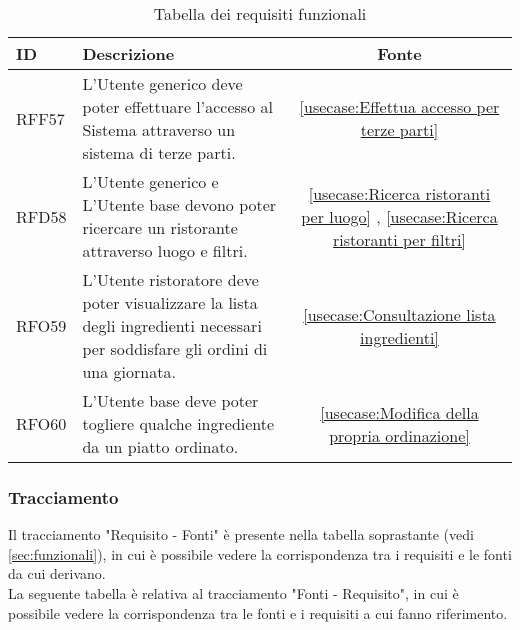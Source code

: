 \begin{table}[H]
	\renewcommand{\arraystretch}{1.5}
	\centering
	\begin{tabularx}{\textwidth}{l|X|c}
		\textbf{ID} & \textbf{Descrizione}                                                                                                    & \textbf{Fonte}                                                       \\
		\hline
		RFF57       & L'Utente generico deve poter effettuare l'accesso al Sistema attraverso un sistema di terze parti.                 	& \autoref{usecase:Effettua accesso per terze parti} \\
		\hline
		RFD58	   & L'Utente generico e L'Utente base devono poter ricercare un
		ristorante attraverso luogo e filtri.  					&
		\autoref{usecase:Ricerca ristoranti per luogo} , \autoref{usecase:Ricerca ristoranti per filtri} \\
		\hline
		RFO59	   & L'Utente ristoratore deve poter visualizzare la lista degli ingredienti necessari per soddisfare gli ordini di una giornata. & \autoref{usecase:Consultazione lista ingredienti} \\ 
		\hline
		RFO60	   & L'Utente base deve poter togliere qualche ingrediente da un piatto ordinato. & \autoref{usecase:Modifica della propria ordinazione} \\
		\end{tabularx}
	\caption{Tabella dei requisiti funzionali}
\end{table}

\newpage
\subsubsection{Tracciamento}
Il tracciamento "Requisito - Fonti" è presente nella tabella soprastante (vedi \autoref{sec:funzionali}), in cui è possibile vedere la corrispondenza tra i requisiti e le fonti da cui derivano.\\
La seguente tabella è relativa al tracciamento "Fonti - Requisito", in cui è possibile vedere la corrispondenza tra le fonti e i requisiti a cui fanno riferimento.\\

